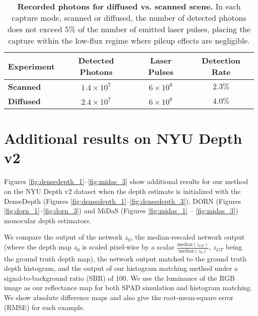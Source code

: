 \documentclass[runningheads]{llncs}
\begin{document}
\begin{table}[ht!]
    \renewcommand{\arraystretch}{1.3}
    \setlength{\tabcolsep}{10pt}
     \centering
     \begin{tabular}{lccc} \toprule
         \textbf{Experiment} & \textbf{Detected Photons} & \textbf{Laser Pulses} & \textbf{Detection Rate} \\\hline
         \textbf{Scanned} & $1.4\times10^7$ & $6\times10^8$ & $2.3\%$ \\
         \textbf{Diffused} & $2.4\times10^7$ & $6\times10^8$ & $4.0\%$ \\
        \bottomrule
    \end{tabular}
    \vspace{0.4em}
    \caption{\textbf{Recorded photons for diffused vs. scanned scene.} In each capture mode, scanned or diffused, the number of detected photons does not exceed 5\% of the number of emitted laser pulses, placing the capture within the low-flux regime where pileup effects are negligible.}
    \label{tab:photon_counts}
\end{table}

\section{Additional results on NYU Depth v2}
Figures \ref{fig:densedepth_1}--\ref{fig:midas_3} show additional results
for our method on the NYU Depth v2 dataset when the depth estimate is
initialized with the DenseDepth \cite{Alhashim2018} (Figures
\ref{fig:densedepth_1}--\ref{fig:densedepth_3}), DORN \cite{Fu2018} (Figures
\ref{fig:dorn_1}--\ref{fig:dorn_3}) 
and MiDaS \cite{Lasinger:2019} (Figures \ref{fig:midas_1} -- \ref{fig:midas_3}) monocular depth estimators.

We compare the output of the network $z_0$, the
median-rescaled network output (where the depth map $z_0$ is scaled pixel-wise by a
scalar $\frac{\text{median}(z_{GT})}{\text{median}(z_0)}$, $z_{GT}$ being the
ground truth depth map), the network output matched to the ground truth depth histogram, and the output of
our histogram matching method under a signal-to-background ratio (SBR) of 100.
We use the luminance of the RGB image as our reflectance map
for both SPAD simulation and histogram matching.
We show absolute difference maps and also give
the root-mean-square error (RMSE) for each example.

\end{document}
